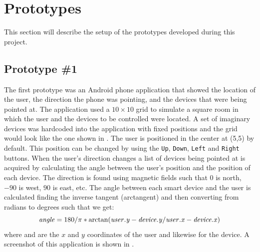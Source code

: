 \section{Prototypes}
This section will describe the setup of the prototypes developed during this project.

\subsection{Prototype \#1}
\label{sec:implementation:prototypes:prototype1}
The first prototype was an Android phone application that showed the location of the user, the direction the phone was pointing, and the devices that were being pointed at.
The application used a $10 \times 10$ grid to simulate a square room in which the user and the devices to be controlled were located.
A set of imaginary devices was hardcoded into the application with fixed positions and the grid would look like the one shown in .
The user is positioned in the center at (5,5) by default. This position can be changed by using the \texttt{Up}, \texttt{Down}, \texttt{Left} and \texttt{Right} buttons.
When the user's direction changes a list of devices being pointed at is acquired by calculating the angle between the user's position and the position of each device.
The direction is found using magnetic fields such that $0$ is north, $-90$ is west, $90$ is east, etc. 
The angle between each smart device and the user is calculated finding the inverse tangent (arctangent) and then converting from radians to degrees such that we get:
\begin{equation}
\var{angle} = 180 / \pi * \arctan(\var{user.y} - \var{device.y} / \var{user.x} - \var{device.x})
\end{equation}
where  and  are the $x$ and $y$ coordinates of the user and likewise for the device.
A screenshot of this application is shown in .



